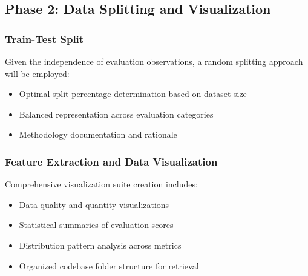 \documentclass[12pt]{article}
\begin{document}
\subsection{Phase 2: Data Splitting and Visualization}

\subsubsection{Train-Test Split}
Given the independence of evaluation observations, a random splitting approach will be employed:
\begin{itemize}
    \item Optimal split percentage determination based on dataset size
    \item Balanced representation across evaluation categories
    \item Methodology documentation and rationale
\end{itemize}

\subsubsection{Feature Extraction and Data Visualization}
Comprehensive visualization suite creation includes:
\begin{itemize}
    \item Data quality and quantity visualizations
    \item Statistical summaries of evaluation scores
    \item Distribution pattern analysis across metrics
    \item Organized codebase folder structure for retrieval
\end{itemize}
\end{document}
